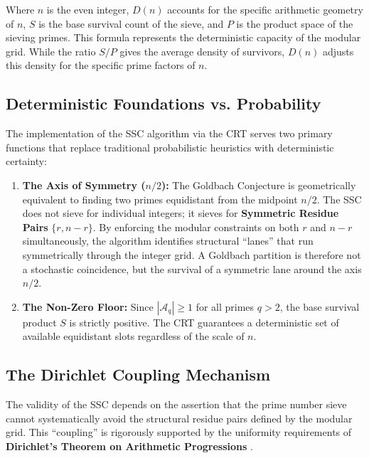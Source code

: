 \documentclass[sn-mathphys-num, pdflatex]{sn-jnl}
\begin{document}
Where $n$ is the even integer, $D(n)$ accounts for the specific arithmetic geometry of $n$, $S$ is the base survival count of the sieve, and $P$ is the product space of the sieving primes. This formula represents the deterministic capacity of the modular grid. While the ratio $S/P$ gives the average density of survivors, $D(n)$ adjusts this density for the specific prime factors of $n$.

\subsection{Deterministic Foundations vs. Probability}
\label{subsec:determinism}

The implementation of the SSC algorithm via the CRT serves two primary functions that replace traditional probabilistic heuristics with deterministic certainty:
\begin{enumerate}
    \item \textbf{The Axis of Symmetry ($n/2$):} The Goldbach Conjecture is geometrically equivalent to finding two primes equidistant from the midpoint $n/2$. The SSC does not sieve for individual integers; it sieves for \textbf{Symmetric Residue Pairs} $\{r, n-r\}$. By enforcing the modular constraints on both $r$ and $n-r$ simultaneously, the algorithm identifies structural ``lanes'' that run symmetrically through the integer grid. A Goldbach partition is therefore not a stochastic coincidence, but the survival of a symmetric lane around the axis $n/2$.
    
    \item \textbf{The Non-Zero Floor:} Since $|\mathcal{A}_q| \ge 1$ for all primes $q > 2$, the base survival product $S$ is strictly positive. The CRT guarantees a deterministic set of available equidistant slots regardless of the scale of $n$.
\end{enumerate}

\subsection{The Dirichlet Coupling Mechanism} 
\label{subsec:dirichlet}

The validity of the SSC depends on the assertion that the prime number sieve cannot systematically avoid the structural residue pairs defined by the modular grid. This ``coupling'' is rigorously supported by the uniformity requirements of \textbf{Dirichlet's Theorem on Arithmetic Progressions} \cite{dirichlet}.
\end{document}
